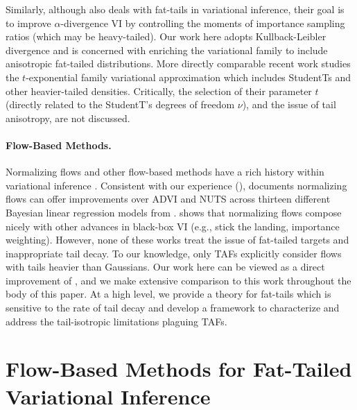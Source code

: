 \documentclass[thesis.tex]{subfiles}
\begin{document}
Similarly, although \citet{wang2018variational} also deals with fat-tails in variational inference,
their goal is to improve $\alpha$-divergence VI by controlling the moments of importance
sampling ratios (which may be heavy-tailed). Our work here adopts
Kullback-Leibler divergence and is concerned with enriching the variational family
to include anisotropic fat-tailed distributions.
More directly comparable recent work \citep{ding2011t,futami2017expectation} studies the $t$-exponential family
variational approximation which includes StudentTs and other
heavier-tailed densities. Critically, the selection of their parameter $t$ (directly related to the
StudentT's degrees of freedom $\nu$), and the issue of tail anisotropy, are not discussed. %

\vspace{-1mm}
\paragraph{Flow-Based Methods.}

Normalizing flows and other flow-based methods have a rich history within variational
inference \citep{kingma2016improved,rezende2015variational,agrawal2020advances,webb2019improving}.
Consistent with our experience (), \citet{webb2019improving}
documents normalizing flows can offer improvements over ADVI and NUTS across thirteen different
Bayesian linear regression models from \citet{gelman2006data}.
\citet{agrawal2020advances} shows that normalizing flows compose nicely with other
advances in black-box VI (e.g., stick the landing, importance weighting).
However, none of these works treat the issue of fat-tailed targets and inappropriate tail
decay.
To our knowledge, only TAFs \citep{jaini2020tails} explicitly consider flows with tails
heavier than Gaussians. Our work here can be viewed as a direct improvement of \citet{jaini2020tails},
and we make extensive comparison to this work throughout the body of this paper. At
a high level, we provide a theory for fat-tails which is sensitive to the rate of
tail decay and develop a framework to characterize and address the tail-isotropic limitations plaguing
TAFs.

\vspace{-2mm}
\section{Flow-Based Methods for Fat-Tailed Variational Inference}
\end{document}
